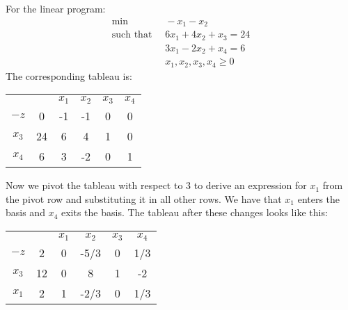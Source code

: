 \begin{example}
    For the linear program:
    \begin{align*}
        \min                      \:&\: -x_1-x_2          \\
        \text{such that }     &\: 6x_1+4x_2+x_3=24  \\
                                    &\: 3x_1-2x_2+x_4=6  \\
                                    &\: x_1,x_2,x_3,x_4 \geq 0
    \end{align*}
    The corresponding tableau is: 
    \begin{table}[H]
        \centering
        \begin{tabular}{cccccc}
                                   &                         & $x_1$ & $x_2$ & $x_3$ & $x_4$                  \\ \cline{2-6} 
        \multicolumn{1}{c|}{$-z$}  & \multicolumn{1}{c|}{0}  & -1    & -1    & 0     & \multicolumn{1}{c|}{0} \\ \cline{2-6} 
        \multicolumn{1}{c|}{$x_3$} & \multicolumn{1}{c|}{24} & 6     & 4     & 1     & \multicolumn{1}{c|}{0} \\
        \multicolumn{1}{c|}{$x_4$} & \multicolumn{1}{c|}{6}  & 3     & -2    & 0     & \multicolumn{1}{c|}{1} \\ \cline{2-6} 
        \end{tabular}
    \end{table}
    Now we pivot the tableau with respect to 3 to derive an expression for $x_1$ from the pivot row and substituting it in all other rows.
    We have that $x_1$ enters the basis and $x_4$ exits the basis. 
    The tableau after these changes looks like this:
    \begin{table}[H]
        \centering
        \begin{tabular}{cccccc}
                                   &                         & $x_1$ & $x_2$ & $x_3$ & $x_4$                    \\ \cline{2-6} 
        \multicolumn{1}{c|}{$-z$}  & \multicolumn{1}{c|}{2}  & 0     & -5/3  & 0     & \multicolumn{1}{c|}{1/3} \\ \cline{2-6} 
        \multicolumn{1}{c|}{$x_3$} & \multicolumn{1}{c|}{12} & 0     & 8     & 1     & \multicolumn{1}{c|}{-2}  \\
        \multicolumn{1}{c|}{$x_1$} & \multicolumn{1}{c|}{2}  & 1     & -2/3  & 0     & \multicolumn{1}{c|}{1/3} \\ \cline{2-6} 
        \end{tabular}

\end{table}
\end{example}
